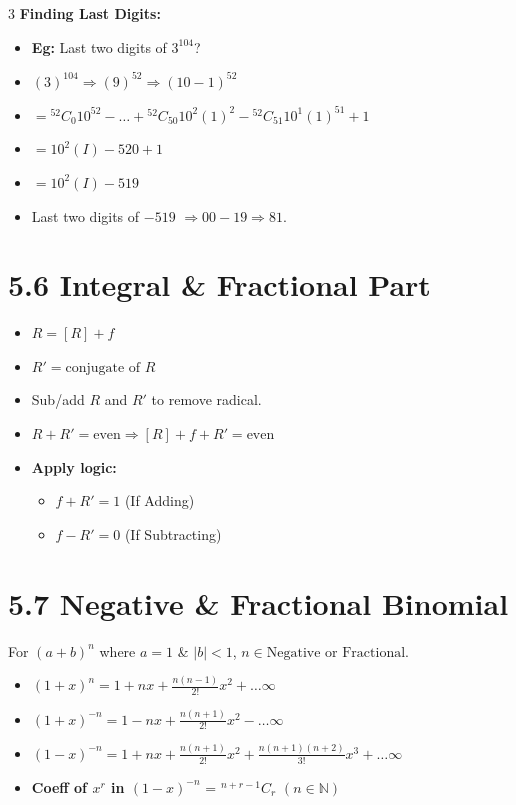 \documentclass[11pt,a4paper,landscape]{article}
\begin{document}
\begin{multicols*}{3}
\textbf{Finding Last Digits:}
\begin{itemize}
\item \textbf{Eg:} Last two digits of $3^{104}$?
\item $(3)^{104} \Rightarrow (9)^{52} \Rightarrow (10-1)^{52}$
\item $= {}^{52}C_0 10^{52} - \dots + {}^{52}C_{50} 10^2(1)^2 - {}^{52}C_{51} 10^1(1)^{51} + 1$
\item $= 10^2(I) - 520 + 1$
\item $= 10^2(I) - 519$ 
\item Last two digits of $-519$ $\Rightarrow 00 - 19 \Rightarrow 81$.
\end{itemize}

\section*{5.6 Integral \& Fractional Part}
\begin{itemize}
\item $R = [R] + f$
\item $R' = \text{conjugate of } R$
\item Sub/add $R$ and $R'$ to remove radical.
\item $R + R' = \text{even} \Rightarrow [R] + f + R' = \text{even}$
\item \textbf{Apply logic:} 
  \begin{itemize}
  \item $f + R' = 1$ (If Adding)
  \item $f - R' = 0$ (If Subtracting)
  \end{itemize}
\end{itemize}

\section*{5.7 Negative \& Fractional Binomial}
For $(a+b)^n$ where $a=1$ \& $|b|<1$, $n \in \text{Negative or Fractional}$.
\begin{itemize}
\item $(1+x)^n = 1 + nx + \frac{n(n-1)}{2!}x^2 + \dots \infty$
\item $(1+x)^{-n} = 1 - nx + \frac{n(n+1)}{2!}x^2 - \dots \infty$
\item $(1-x)^{-n} = 1 + nx + \frac{n(n+1)}{2!}x^2 + \frac{n(n+1)(n+2)}{3!}x^3 + \dots \infty$
\item \textbf{Coeff of $x^r$ in $(1-x)^{-n}$} = ${}^{n+r-1}C_r$ \quad $(n \in \mathbb{N})$
\end{itemize}


\end{multicols*}
\end{document}
